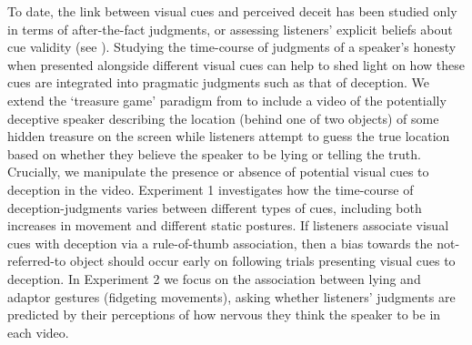 \documentclass[a4paper,man,natbib]{apa6}
\begin{document}
To date, the link between visual cues and perceived deceit has been studied only in terms of after-the-fact judgments, or assessing listeners' explicit beliefs about cue validity (see \citealt{Vrij1996a, Zuckerman1981a}).
Studying the time-course of judgments of a speaker's honesty when presented alongside different visual cues can help to shed light on how these cues are integrated into pragmatic judgments such as that of deception. %
We extend the `treasure game' paradigm from \citet{Loy2017} to include a video of the potentially deceptive speaker describing the location (behind one of two objects) of some hidden treasure on the screen while listeners attempt to guess the true location based on whether they believe the speaker to be lying or telling the truth. 
Crucially, we manipulate the presence or absence of potential visual cues to deception in the video.
Experiment 1 investigates how the time-course of deception-judgments varies between different types of cues, including both increases in movement and different static postures.
If listeners associate visual cues with deception via a rule-of-thumb association, then a bias towards the not-referred-to object should occur early on following trials presenting visual cues to deception.
In Experiment 2 we focus on the association between lying and adaptor gestures (fidgeting movements), asking whether listeners' judgments are predicted by their perceptions of how nervous they think the speaker to be in each video.
\end{document}

